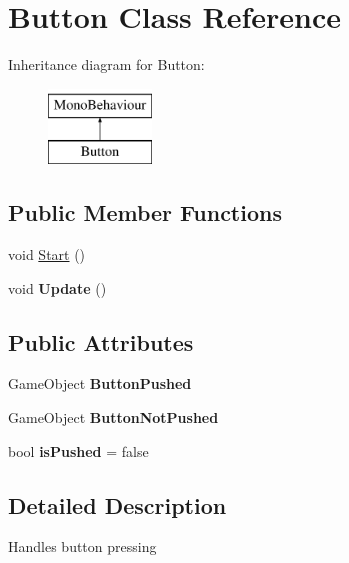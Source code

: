 \hypertarget{class_button}{}\section{Button Class Reference}
\label{class_button}
Inheritance diagram for Button\+:\begin{figure}[H]
\begin{center}
\leavevmode
\includegraphics[height=2.000000cm]{class_button}
\end{center}
\end{figure}
\subsection*{Public Member Functions}
\begin{DoxyCompactItemize}
\item 
void \mbox{\hyperlink{class_button_a1ca1f623a8d5f7e9453eee7698e216ec}{Start}} ()
\item 
\mbox{\label{class_button_abde2585e345c77634cc81b2f46c24936}} 
void {\bfseries Update} ()
\end{DoxyCompactItemize}
\subsection*{Public Attributes}
\begin{DoxyCompactItemize}
\item 
\mbox{\label{class_button_a6dff8f642d1cb675dbbca7fbe336850f}} 
Game\+Object {\bfseries Button\+Pushed}
\item 
\mbox{\label{class_button_a3fcbf5e728ccad68b7e80928ca8211f0}} 
Game\+Object {\bfseries Button\+Not\+Pushed}
\item 
\mbox{\label{class_button_a1337709a1b2053148558e140ff59224b}} 
bool {\bfseries is\+Pushed} = false
\end{DoxyCompactItemize}


\subsection{Detailed Description}
Handles button pressing 

